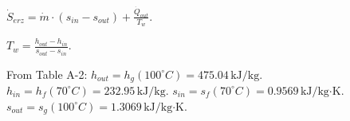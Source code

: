 \( \dot{S}_{erz} = \dot{m} \cdot (s_{in} - s_{out}) + \frac{\dot{Q}_{out}}{T_w} \).  

\( T_w = \frac{h_{out} - h_{in}}{s_{out} - s_{in}} \).  

From Table A-2:  
\( h_{out} = h_g(100^\circ C) = 475.04 \, \text{kJ/kg} \).  
\( h_{in} = h_f(70^\circ C) = 232.95 \, \text{kJ/kg} \).  
\( s_{in} = s_f(70^\circ C) = 0.9569 \, \text{kJ/kg·K} \).  
\( s_{out} = s_g(100^\circ C) = 1.3069 \, \text{kJ/kg·K} \).